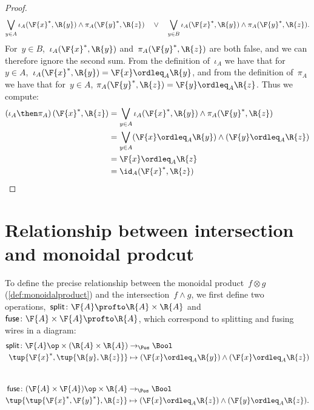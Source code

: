 \begin{proof}
\begin{equation}
		\bigvee_{y \in A} \iota_A(\F{x}^*,\R{y}) \wedge \pi_A(\F{y}^*,\R{z}) \quad\vee\quad
		\bigvee_{y \in B} \iota_A(\F{x}^*,\R{y}) \wedge \pi_A(\F{y}^*,\R{z}).
	\end{equation}
	For~$y \in B$,~$\iota_A(\F{x}^*,\R{y})$ and~$\pi_A(\F{y}^*,\R{z})$ are both false, and we can therefore ignore the second sum.
	From the definition of~$\iota_A$ we have that for~$y\in A$,~$ \iota_A(\F{x}^*,\R{y})=\F{x} \ordleq_A \R{y}$, and from the definition of~$\pi_A$ we have that for~$y\in A$, $\pi_A(\F{y}^*,\R{z})=\F{y} \ordleq_A \R{z}$.
	Thus we compute:
	\begin{equation}
		\begin{aligned}
			\left(\iota_A\then \pi_A\right)(\F{x}^*, \R{z}) & = \bigvee_{y \in A} \iota_A(\F{x}^*,\R{y}) \wedge \pi_A(\F{y}^*,\R{z})      \\
			                                                & = \bigvee_{y \in A} (\F{x} \ordleq_A \R{y}) \wedge  (\F{y} \ordleq_A \R{z}) \\
			                                                & = \F{x} \ordleq_A \R{z}                                                     \\
			                                                & = \id_A(\F{x}^*, \R{z})
		\end{aligned}
	\end{equation}
\end{proof}

\section{Relationship between intersection and monoidal prodcut}
To define the precise relationship between the monoidal product~$f \otimes g$ (\cref{def:monoidalproduct}) and the intersection~$f \wedge g$, we first define two operations,~$\mathsf{split} \colon \F{A} \profto \R{A} \times \R{A}$ and~$\mathsf{fuse} \colon \F{A} \times \F{A} \profto \R{A}$, which correspond to splitting and fusing wires in a diagram:
\begin{equation}
	\begin{aligned}
		\mathsf{split} \colon \F{A}\op \times (\R{A} \times \R{A}) & \to_\Pos \Bool                                                 \\
		\tup{\F{x}^*, \tup{\R{y}, \R{z}}}                          & \mapsto (\F{x} \ordleq_A \R{y}) \wedge (\F{x} \ordleq_A \R{z})
	\end{aligned}
\end{equation}
~
\begin{equation}
	\begin{aligned}
		\mathsf{fuse} \colon (\F{A} \times \F{A})\op \times \R{A} & \to_\Pos \Bool                                                  \\
		\tup{ \tup{\F{x}^*, \F{y}^*}, \R{z}}                      & \mapsto (\F{x} \ordleq_A \R{z}) \wedge (\F{y} \ordleq_A \R{z}).
	\end{aligned}
\end{equation}

